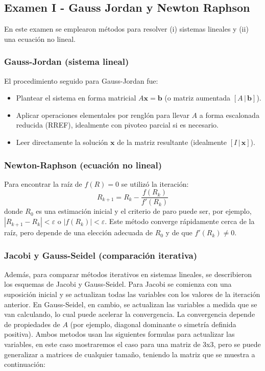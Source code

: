 \documentclass[pdflatex,sn-mathphys-num]{sn-jnl}%
\begin{document}
\subsection{Examen I - Gauss Jordan y Newton Raphson}
En este examen se emplearon métodos para resolver (i) sistemas lineales y (ii) una ecuación no lineal.

\subsubsection{Gauss-Jordan (sistema lineal)}
El procedimiento seguido para Gauss-Jordan fue:
\begin{itemize}
    \item Plantear el sistema en forma matricial $A\mathbf{x}=\mathbf{b}$ (o matriz aumentada $[A\,|\,\mathbf{b}]$).
    \item Aplicar operaciones elementales por renglón para llevar $A$ a forma escalonada reducida (RREF), idealmente con pivoteo parcial si es necesario.
    \item Leer directamente la solución $\mathbf{x}$ de la matriz resultante (idealmente $[I\,|\,\mathbf{x}]$).
\end{itemize}

\subsubsection{Newton-Raphson (ecuación no lineal)}
Para encontrar la raíz de $f(R)=0$ se utilizó la iteración:
\begin{equation}
R_{k+1}=R_k-\frac{f(R_k)}{f'(R_k)}
\end{equation}
donde $R_0$ es una estimación inicial y el criterio de paro puede ser, por ejemplo, $|R_{k+1}-R_k|<\varepsilon$ o $|f(R_k)|<\varepsilon$. Este método converge rápidamente cerca de la raíz, pero depende de una elección adecuada de $R_0$ y de que $f'(R_k)\neq 0$.

\subsubsection{Jacobi y Gauss-Seidel (comparación iterativa)}
Además, para comparar métodos iterativos en sistemas lineales, se describieron los esquemas de Jacobi y Gauss-Seidel. Para Jacobi se comienza con una suposición inicial y se actualizan todas las variables con los valores de la iteración anterior. En Gauss-Seidel, en cambio, se actualizan las variables a medida que se van calculando, lo cual puede acelerar la convergencia. La convergencia depende de propiedades de $A$ (por ejemplo, diagonal dominante o simetría definida positiva).
Ambos metodos usan las siguientes formulas para actualizar las variables, en este caso mostraremos el caso para una matriz de 3x3, pero se puede generalizar a matrices de cualquier tamaño, teniendo la matriz que se muestra a continuación:
\end{document}
